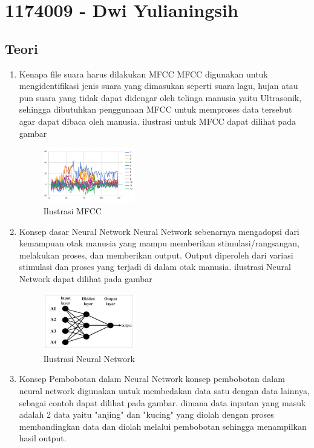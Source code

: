 \section{1174009 - Dwi Yulianingsih}
    \subsection{Teori}
    \begin{enumerate}
        \item Kenapa file suara harus dilakukan MFCC
        \subitem MFCC digunakan untuk mengidentifikasi jenis suara yang dimasukan seperti suara lagu, hujan atau pun suara yang tidak dapat didengar oleh telinga manusia yaitu Ultrasonik, sehingga dibutuhkan penggunaan MFCC untuk memproses data tersebut agar dapat dibaca oleh manusia. ilustrasi untuk MFCC dapat dilihat pada gambar
        
        \begin{figure}[H]
            \includegraphics[width=4cm]{figures/1174009/chapter6/teori1.png}
            \centering
              \caption{Ilustrasi MFCC}
        \end{figure}
        
        \item Konsep dasar Neural Network
        \subitem Neural Network sebenarnya mengadopsi dari kemampuan otak manusia yang mampu memberikan stimulasi/rangsangan, melakukan proses, dan memberikan output. Output diperoleh dari variasi stimulasi dan proses yang terjadi di dalam otak manusia.
        ilustrasi Neural Network dapat dilihat pada gambar
        
        \begin{figure}[H]
            \includegraphics[width=4cm]{figures/1174009/chapter6/teori2.png}
            \centering
              \caption{Ilustrasi Neural Network}
        \end{figure}
        
        \item Konsep Pembobotan dalam Neural Network
        \subitem konsep pembobotan dalam neural network digunakan untuk membedakan data satu dengan data lainnya, sebagai contoh dapat dilihat pada gambar. dimana data inputan yang masuk adalah 2 data yaitu "anjing" dan "kucing" yang diolah dengan proses membandingkan data dan diolah melalui pembobotan sehingga menampilkan hasil output.
        

\end{enumerate}

